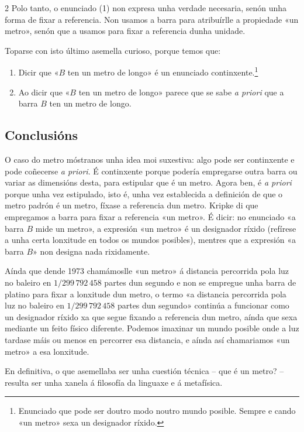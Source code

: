 \begin{multicols}{2}
Polo tanto, o enunciado (1) non expresa unha verdade necesaria, senón unha
forma de fixar a referencia. Non usamos a barra para atribuírlle a propiedade
«un metro», senón que a usamos para fixar a referencia dunha unidade.

\goodbreak
Toparse con isto último asemella curioso, porque temos que:

\begin{enumerate}
   \item Dicir que «$B$ ten un metro de longo» é un enunciado
       continxente.\footnote{Enunciado que pode ser doutro modo noutro mundo
       posible. Sempre e cando «un metro» sexa un designador ríxido.}
   \item  Ao dicir que «$B$ ten un metro de longo» parece que se sabe
       \textit{a priori} que a barra $B$ ten un metro de longo.
\end{enumerate}

\subsection*{Conclusións}

O caso do metro móstranos unha idea moi suxestiva: algo pode ser continxente e
pode coñecerse \textit{a priori}. É continxente porque podería empregarse outra
barra ou variar as dimensións desta, para estipular que é un metro. Agora ben,
é \textit{a priori} porque unha vez estipulado, isto é, unha vez establecida a
definición de que o metro padrón é un metro, fíxase a referencia dun metro.
Kripke di que empregamos a barra para fixar a referencia «un metro». É dicir:
no enunciado «a barra $B$ mide un metro», a expresión «un metro» é un
designador ríxido (refírese a unha certa lonxitude en todos os mundos
posibles), mentres que a expresión «a barra $B$» non designa nada rixidamente.

Aínda que dende 1973 chamámoslle «un metro» á distancia percorrida pola luz no
baleiro en $1/299\, 792\, 458$ partes dun segundo e non se empregue unha barra
de platino para fixar a lonxitude dun metro, o termo «a distancia percorrida
pola luz no baleiro en $1/299\, 792\, 458$ partes dun segundo» continúa a
funcionar como un designador ríxido xa que segue fixando a referencia dun
metro, aínda que sexa mediante un feito físico diferente. Podemos imaxinar un
mundo posible onde a luz tardase máis ou menos en percorrer esa distancia, e
aínda así chamariamos «un metro» a esa lonxitude.

En definitiva, o que asemellaba ser unha cuestión técnica – que é un metro? –
resulta ser unha xanela á filosofía da linguaxe e á metafísica.

\nocite{kripke_1985}
\nocite{themetre}

\printbibliography

\end{multicols}
